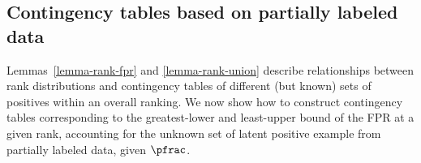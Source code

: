 \subsection{Contingency tables based on partially labeled data}
Lemmas~\ref*{lemma-rank-fpr} and \ref*{lemma-rank-union} describe relationships between rank distributions and contingency tables of different (but known) sets of positives within an overall ranking. 
We now show how to construct contingency tables corresponding to the greatest-lower and least-upper bound of the FPR at a given rank, accounting for the unknown set of latent positive example from partially labeled data, given $\pfrac$. 





